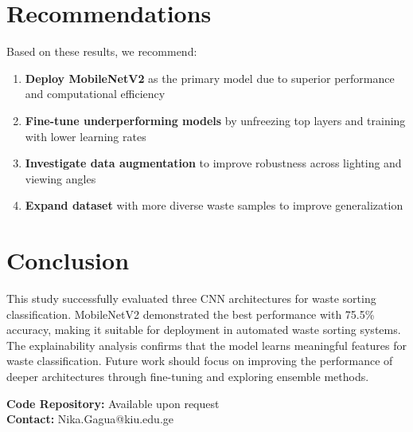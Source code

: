 \documentclass[11pt,a4paper]{article}
\begin{document}
\section{Recommendations}

Based on these results, we recommend:

\begin{enumerate}
    \item \textbf{Deploy MobileNetV2} as the primary model due to superior performance and computational efficiency
    \item \textbf{Fine-tune underperforming models} by unfreezing top layers and training with lower learning rates
    \item \textbf{Investigate data augmentation} to improve robustness across lighting and viewing angles
    \item \textbf{Expand dataset} with more diverse waste samples to improve generalization
\end{enumerate}

\section{Conclusion}

This study successfully evaluated three CNN architectures for waste sorting classification. MobileNetV2 demonstrated the best performance with 75.5\% accuracy, making it suitable for deployment in automated waste sorting systems. The explainability analysis confirms that the model learns meaningful features for waste classification. Future work should focus on improving the performance of deeper architectures through fine-tuning and exploring ensemble methods.

\vspace{1cm}

\noindent\textbf{Code Repository:} Available upon request\\
\textbf{Contact:} Nika.Gagua@kiu.edu.ge
\end{document}
